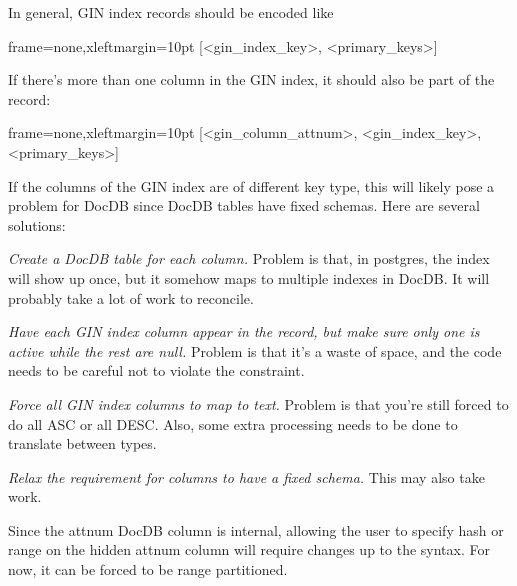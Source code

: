 In general, GIN index records should be encoded like

\begin{textcode*}{frame=none,xleftmargin=10pt}
[<gin_index_key>, <primary_keys>]
\end{textcode*}

If there's more than one column in the GIN index, it should also be part of the
record:

\begin{textcode*}{frame=none,xleftmargin=10pt}
[<gin_column_attnum>, <gin_index_key>, <primary_keys>]
\end{textcode*}

If the columns of the GIN index are of different key type, this will likely
pose a problem for DocDB since DocDB tables have fixed schemas.  Here are
several solutions:

\begin{oparts}
\item
  \emph{Create a DocDB table for each column.}  Problem is that, in postgres,
  the index will show up once, but it somehow maps to multiple indexes in
  DocDB.  It will probably take a lot of work to reconcile.
\item
  \emph{Have each GIN index column appear in the record, but make sure only one
  is active while the rest are null.}  Problem is that it's a waste of space,
  and the code needs to be careful not to violate the constraint.
\item
  \emph{Force all GIN index columns to map to text.}  Problem is that you're
  still forced to do all ASC or all DESC.  Also, some extra processing needs to
  be done to translate between types.
\item
  \emph{Relax the requirement for columns to have a fixed schema.}  This may
  also take work.
\end{oparts}

Since the attnum DocDB column is internal, allowing the user to specify hash or
range on the hidden attnum column will require changes up to the syntax.  For
now, it can be forced to be range partitioned.
